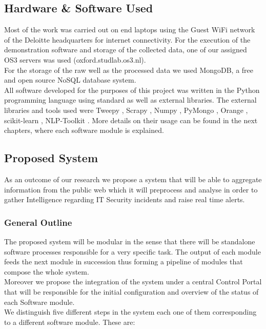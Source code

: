 \documentclass[12pt]{article}
\begin{document}
\subsection{Hardware \& Software Used}
\parbox{\linewidth}{

Most of the work was carried out on end laptops using the Guest WiFi network of the Deloitte headquarters for internet connectivity. For the execution of the demonstration software and storage of the collected data, one of our assigned OS3 servers was used (oxford.studlab.os3.nl).\\ 
For the storage of the raw well as the processed data we used MongoDB, a free and open source NoSQL database system.\\ 
All software developed for the purposes of this project was written in the Python programming language using standard as well as external libraries. The external libraries and tools used were Tweepy \cite{tweepy}, Scrapy \cite{scrap}, Numpy \cite{numpy}, PyMongo \cite{pymongo}, Orange \cite{orange}, scikit-learn \cite{sklearn}, NLP-Toolkit \cite{nltk}. More details on their usage can be found in the next chapters, where each software module is explained.}


\subsection{Proposed System}
As an outcome of our research we propose a system that will be able to aggregate information from the public web which it will preprocess and analyse in order to gather Intelligence regarding IT Security incidents and raise real time alerts. 
 
\subsubsection{General Outline}
The proposed system will be modular in the sense that there will be standalone software processes responsible for a very specific task. The output of each module feeds the next module in succession thus forming a pipeline of modules that compose the whole system. \\
Moreover we propose the integration of the system under a central Control Portal that will be responsible for the initial configuration and overview of the status of each Software module.\\
We distinguish five different steps in the system each one of them corresponding to a different software module. These are:
\end{document}
